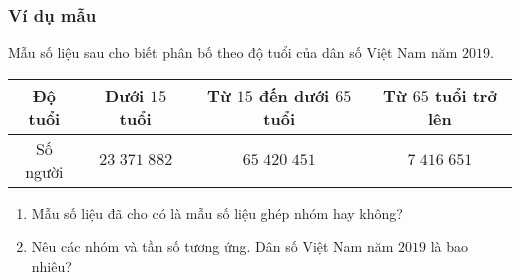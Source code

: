 \subsubsection{Ví dụ mẫu}
\begin{vd}%
	Mẫu số liệu sau cho biết phân bố theo độ tuổi của dân số Việt Nam năm $2019$.
	\begin{center}
		\begin{tabular}{|c|c|c|c|}
			\hline
			Độ tuổi&Dưới $15$ tuổi&Từ $15$ đến dưới $65$ tuổi&Từ $65$ tuổi trở lên\\
			\hline
			Số người& $23\;371\;882$&$65\;420\;451$&$7\;416\;651$\\
			\hline
		\end{tabular}
	\end{center}
	\begin{enumerate}
		\item Mẫu số liệu đã cho có là mẫu số liệu ghép nhóm hay không?
		\item Nêu các nhóm và tần số tương ứng. Dân số Việt Nam năm $2019$ là bao nhiêu?
	\end{enumerate}
\end{vd}

